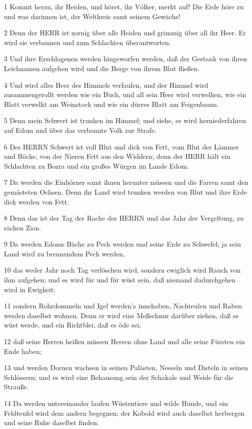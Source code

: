 \par 1 Kommt herzu, ihr Heiden, und höret, ihr Völker, merkt auf! Die Erde höre zu und was darinnen ist, der Weltkreis samt seinem Gewächs!
\par 2 Denn der HERR ist zornig über alle Heiden und grimmig über all ihr Heer. Er wird sie verbannen und zum Schlachten überantworten.
\par 3 Und ihre Erschlagenen werden hingeworfen werden, daß der Gestank von ihren Leichnamen aufgehen wird und die Berge von ihrem Blut fließen.
\par 4 Und wird alles Heer des Himmels verfaulen, und der Himmel wird zusammengerollt werden wie ein Buch, und all sein Heer wird verwelken, wie ein Blatt verwelkt am Weinstock und wie ein dürres Blatt am Feigenbaum.
\par 5 Denn mein Schwert ist trunken im Himmel; und siehe, es wird herniederfahren auf Edom und über das verbannte Volk zur Strafe.
\par 6 Des HERRN Schwert ist voll Blut und dick von Fett, vom Blut der Lämmer und Böcke, von der Nieren Fett aus den Widdern; denn der HERR hält ein Schlachten zu Bozra und ein großes Würgen im Lande Edom.
\par 7 Da werden die Einhörner samt ihnen herunter müssen und die Farren samt den gemästeten Ochsen. Denn ihr Land wird trunken werden von Blut und ihre Erde dick werden von Fett.
\par 8 Denn das ist der Tag der Rache des HERRN und das Jahr der Vergeltung, zu rächen Zion.
\par 9 Da werden Edoms Bäche zu Pech werden und seine Erde zu Schwefel; ja sein Land wird zu brennendem Pech werden,
\par 10 das weder Jahr noch Tag verlöschen wird, sondern ewiglich wird Rauch von ihm aufgehen; und es wird für und für wüst sein, daß niemand dadurchgehen wird in Ewigkeit;
\par 11 sondern Rohrdommeln und Igel werden's innehaben, Nachteulen und Raben werden daselbst wohnen. Denn er wird eine Meßschnur darüber ziehen, daß es wüst werde, und ein Richtblei, daß es öde sei,
\par 12 daß seine Herren heißen müssen Herren ohne Land und alle seine Fürsten ein Ende haben;
\par 13 und werden Dornen wachsen in seinen Palästen, Nesseln und Disteln in seinen Schlössern; und es wird eine Behausung sein der Schakale und Weide für die Strauße.
\par 14 Da werden untereinander laufen Wüstentiere und wilde Hunde, und ein Feldteufel wird dem andern begegnen; der Kobold wird auch daselbst herbergen und seine Ruhe daselbst finden.
